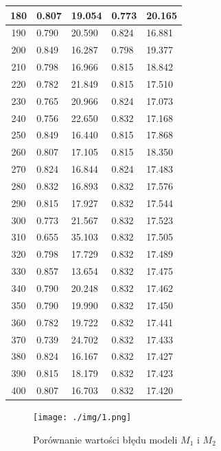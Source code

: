 \documentclass{report}
\begin{document}
\begin{longtable}{|c|l|l|l|l|}
        180 & 0.807 & 19.054 & 0.773 & 20.165 \\ \hline
        190 & 0.790 & 20.590 & 0.824 & 16.881 \\ \hline
        200 & 0.849 & 16.287 & 0.798 & 19.377 \\ \hline
        210 & 0.798 & 16.966 & 0.815 & 18.842 \\ \hline
        220 & 0.782 & 21.849 & 0.815 & 17.510 \\ \hline
        230 & 0.765 & 20.966 & 0.824 & 17.073 \\ \hline
        240 & 0.756 & 22.650 & 0.832 & 17.168 \\ \hline
        250 & 0.849 & 16.440 & 0.815 & 17.868 \\ \hline
        260 & 0.807 & 17.105 & 0.815 & 18.350 \\ \hline
        270 & 0.824 & 16.844 & 0.824 & 17.483 \\ \hline
        280 & 0.832 & 16.893 & 0.832 & 17.576 \\ \hline
        290 & 0.815 & 17.927 & 0.832 & 17.544 \\ \hline
        300 & 0.773 & 21.567 & 0.832 & 17.523 \\ \hline
        310 & 0.655 & 35.103 & 0.832 & 17.505 \\ \hline
        320 & 0.798 & 17.729 & 0.832 & 17.489 \\ \hline
        330 & 0.857 & 13.654 & 0.832 & 17.475 \\ \hline
        340 & 0.790 & 20.248 & 0.832 & 17.462 \\ \hline
        350 & 0.790 & 19.990 & 0.832 & 17.450 \\ \hline
        360 & 0.782 & 19.722 & 0.832 & 17.441 \\ \hline
        370 & 0.739 & 24.702 & 0.832 & 17.433 \\ \hline
        380 & 0.824 & 16.167 & 0.832 & 17.427 \\ \hline
        390 & 0.815 & 18.179 & 0.832 & 17.423 \\ \hline
        400 & 0.807 & 16.703 & 0.832 & 17.420 \\
    \end{longtable}

    \begin{figure}[h]
        \centering
        \texttt{[image: ./img/1.png]}
        \caption{Porównanie wartości błędu modeli $M_1$ i $M_2$}
    \end{figure}
\end{document}
